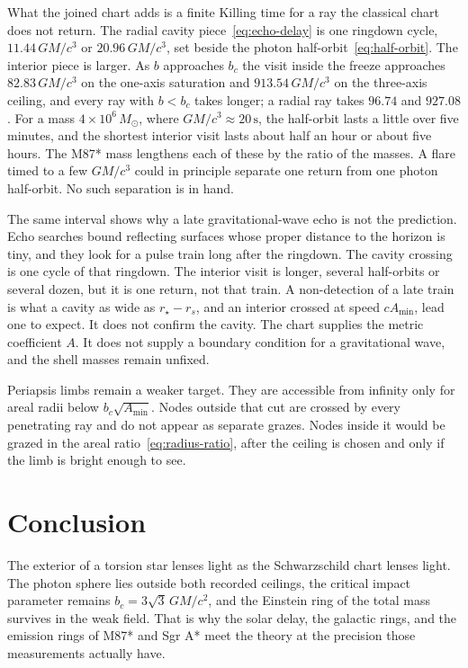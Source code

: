 \documentclass[a4paper]{article}
\begin{document}
What the joined chart adds is a finite Killing time for a ray the classical chart does not return. The radial cavity piece~\eqref{eq:echo-delay} is one ringdown cycle, \(11.44\,GM/c^3\) or \(20.96\,GM/c^3\), set beside the photon half-orbit~\eqref{eq:half-orbit}. The interior piece is larger. As \(b\) approaches \(b_c\) the visit inside the freeze approaches \(82.83\,GM/c^3\) on the one-axis saturation and \(913.54\,GM/c^3\) on the three-axis ceiling, and every ray with \(b<b_c\) takes longer; a radial ray takes \(96.74\) and \(927.08\). For a mass \(4\times 10^6\,M_\odot\), where \(GM/c^3\approx 20\,\mathrm{s}\), the half-orbit lasts a little over five minutes, and the shortest interior visit lasts about half an hour or about five hours. The M87* mass lengthens each of these by the ratio of the masses. A flare timed to a few \(GM/c^3\) could in principle separate one return from one photon half-orbit. No such separation is in hand.

The same interval shows why a late gravitational-wave echo is not the prediction. Echo searches bound reflecting surfaces whose proper distance to the horizon is tiny, and they look for a pulse train long after the ringdown. The cavity crossing is one cycle of that ringdown. The interior visit is longer, several half-orbits or several dozen, but it is one return, not that train. A non-detection of a late train is what a cavity as wide as \(r_\star-r_s\), and an interior crossed at speed \(c A_{\min}\), lead one to expect. It does not confirm the cavity. The chart supplies the metric coefficient \(A\). It does not supply a boundary condition for a gravitational wave, and the shell masses remain unfixed.

Periapsis limbs remain a weaker target. They are accessible from infinity only for areal radii below \(b_c\sqrt{A_{\min}}\). Nodes outside that cut are crossed by every penetrating ray and do not appear as separate grazes. Nodes inside it would be grazed in the areal ratio~\eqref{eq:radius-ratio}, after the ceiling is chosen and only if the limb is bright enough to see.

\section{Conclusion}
\label{sec:conclusion}

The exterior of a torsion star lenses light as the Schwarzschild chart lenses light. The photon sphere lies outside both recorded ceilings, the critical impact parameter remains \(b_c=3\sqrt{3}\,GM/c^2\), and the Einstein ring of the total mass survives in the weak field. That is why the solar delay, the galactic rings, and the emission rings of M87* and Sgr A* meet the theory at the precision those measurements actually have.
\end{document}
